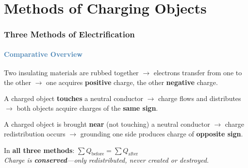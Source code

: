 \section{Methods of Charging Objects}

\begin{frame}
\frametitle{\textsf{\textbf{Three Methods of Electrification}}}
\framesubtitle{\textcolor{steelblue}{Comparative Overview}}

\vspace{-0.05cm}

\begin{examplebox}
\vspace{0.05cm}
Two insulating materials are rubbed together $\rightarrow$ electrons transfer from one to the other $\rightarrow$ one acquires \textbf{positive} charge, the other \textbf{negative} charge.
\vspace{0.05cm}
\end{examplebox}

\vspace{0.25cm}

\begin{examplebox}
\vspace{0.05cm}
A charged object \textbf{touches} a neutral conductor $\rightarrow$ charge flows and distributes $\rightarrow$ both objects acquire charges of the \textbf{same sign}.
\vspace{0.05cm}
\end{examplebox}

\vspace{0.25cm}

\begin{examplebox}
\vspace{0.05cm}
A charged object is brought \textbf{near} (not touching) a neutral conductor $\rightarrow$ charge redistribution occurs $\rightarrow$ grounding one side produces charge of \textbf{opposite sign}.
\vspace{0.05cm}
\end{examplebox}

\vspace{0.3cm}

\begin{formulabox}
\vspace{0.1cm}
\centering
\Large In \textbf{all three methods}: \quad $\boxed{\sum Q_{\text{before}} = \sum Q_{\text{after}}}$\\[0.15cm]
\normalsize\textit{Charge is \textbf{conserved}—only redistributed, never created or destroyed.}
\vspace{0.1cm}
\end{formulabox}


\end{frame}
